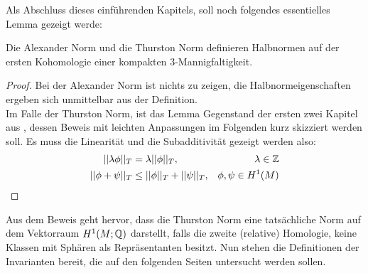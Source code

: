         Als Abschluss dieses einführenden Kapitels, soll noch folgendes essentielles Lemma gezeigt werde:
        \begin{lem}
        	Die Alexander Norm und die Thurston Norm definieren Halbnormen auf der ersten Kohomologie einer kompakten 3-Mannigfaltigkeit. 
        \end{lem}
        \begin{proof}
            Bei der Alexander Norm ist nichts zu zeigen, die Halbnormeigenschaften ergeben sich unmittelbar aus der Definition.\\
            Im Falle der Thurston Norm, ist das Lemma Gegenstand der ersten zwei Kapitel aus \cite{Thurston1986}, dessen Beweis mit leichten Anpassungen im Folgenden kurz skizziert werden soll.
            Es muss die Linearität und die Subadditivität gezeigt werden also:
            \begin{align}
                ||\lambda\phi||_T & = \lambda ||\phi||_T ,&\lambda \in\mathbb{Z} \\
                ||\phi + \psi||_T &\leq ||\phi||_T + ||\psi||_T ,& \phi,\psi \in H^1(M)
            \end{align}
        \end{proof}

        Aus dem Beweis geht hervor, dass die Thurston Norm eine tatsächliche Norm auf dem Vektorraum $H^1(M;\mathbb{Q})$ darstellt, falls die zweite (relative) Homologie, keine Klassen mit Sphären als Repräsentanten besitzt. Nun stehen die Definitionen der Invarianten bereit, die auf den folgenden Seiten untersucht werden sollen.